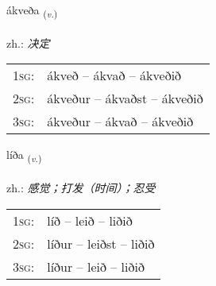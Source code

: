 \documentclass[frontgrid, backgrid]{flacards}\usepackage[]{graphicx}\usepackage[]{xcolor}
\begin{document}
\renewcommand{\blhead}{\vskip5pt {\small\bfseries\footnotesize Sagnorð | 动词 }}
\renewcommand{\bcfoot}{\vskip5pt \hspace{2pt}{\small\bfseries\footnotesize 1K}}


{ákveða \small{\textsubscript{(\textit{v.})}} \\[1ex] %
\textphonetic{[auːkʰvɛða]} \\
zh.: \emph{决定} \\  [2ex]
\renewcommand*{\arraystretch}{0.8}
\begin{tabular}{p{1cm}l}
\textsc{1sg}: & ákveð -- ákvað -- ákveðið \\ 
\textsc{2sg}: & ákveður -- ákvaðst -- ákveðið \\ 
\textsc{3sg}: & ákveður -- ákvað -- ákveðið \\ 
\end{tabular}
}

\renewcommand{\flhead}{\vskip5pt \fboxsep=0pt {\small\bfseries\footnotesize Sagnorð | 动词}}
\renewcommand{\fcfoot}{\vskip5pt \fboxsep=0pt \hspace{2pt}{\small\bfseries\footnotesize 1K}}

\renewcommand{\blhead}{\vskip5pt {\small\bfseries\footnotesize Sagnorð | 动词 }}
\renewcommand{\bcfoot}{\vskip5pt \hspace{2pt}{\small\bfseries\footnotesize 1K}}


{líða \small{\textsubscript{(\textit{v.})}} \\[1ex] %
\textphonetic{[liːða]} \\
zh.: \emph{感觉；打发（时间）；忍受} \\  [2ex]
\renewcommand*{\arraystretch}{0.8}
\begin{tabular}{p{1cm}l}
\textsc{1sg}: & líð -- leið -- liðið \\ 
\textsc{2sg}: & líður -- leiðst -- liðið \\ 
\textsc{3sg}: & líður -- leið -- liðið \\ 
\end{tabular}
}
\end{document}
